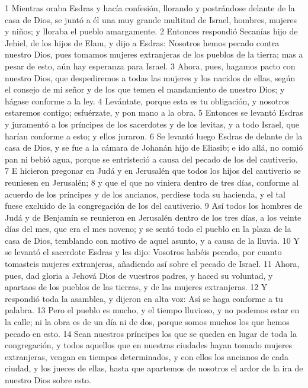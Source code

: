 1 Mientras oraba Esdras y hacía confesión, llorando y postrándose delante de la casa de Dios, se juntó a él una muy grande multitud de Israel, hombres, mujeres y niños; y lloraba el pueblo amargamente.
2 Entonces respondió Secanías hijo de Jehiel, de los hijos de Elam, y dijo a Esdras: Nosotros hemos pecado contra nuestro Dios, pues tomamos mujeres extranjeras de los pueblos de la tierra; mas a pesar de esto, aún hay esperanza para Israel.
3 Ahora, pues, hagamos pacto con nuestro Dios, que despediremos a todas las mujeres y los nacidos de ellas, según el consejo de mi señor y de los que temen el mandamiento de nuestro Dios; y hágase conforme a la ley.
4 Levántate, porque esta es tu obligación, y nosotros estaremos contigo; esfuérzate, y pon mano a la obra.
5 Entonces se levantó Esdras y juramentó a los príncipes de los sacerdotes y de los levitas, y a todo Israel, que harían conforme a esto; y ellos juraron. 
6 Se levantó luego Esdras de delante de la casa de Dios, y se fue a la cámara de Johanán hijo de Eliasib; e ido allá, no comió pan ni bebió agua, porque se entristeció a causa del pecado de los del cautiverio.
7 E hicieron pregonar en Judá y en Jerusalén que todos los hijos del cautiverio se reuniesen en Jerusalén;
8 y que el que no viniera dentro de tres días, conforme al acuerdo de los príncipes y de los ancianos, perdiese toda su hacienda, y el tal fuese excluido de la congregación de los del cautiverio.
9 Así todos los hombres de Judá y de Benjamín se reunieron en Jerusalén dentro de los tres días, a los veinte días del mes, que era el mes noveno; y se sentó todo el pueblo en la plaza de la casa de Dios, temblando con motivo de aquel asunto, y a causa de la lluvia.
10 Y se levantó el sacerdote Esdras y les dijo: Vosotros habéis pecado, por cuanto tomasteis mujeres extranjeras, añadiendo así sobre el pecado de Israel.
11 Ahora, pues, dad gloria a Jehová Dios de vuestros padres, y haced su voluntad, y apartaos de los pueblos de las tierras, y de las mujeres extranjeras.
12 Y respondió toda la asamblea, y dijeron en alta voz: Así se haga conforme a tu palabra.
13 Pero el pueblo es mucho, y el tiempo lluvioso, y no podemos estar en la calle; ni la obra es de un día ni de dos, porque somos muchos los que hemos pecado en esto.
14 Sean nuestros príncipes los que se queden en lugar de toda la congregación, y todos aquellos que en nuestras ciudades hayan tomado mujeres extranjeras, vengan en tiempos determinados, y con ellos los ancianos de cada ciudad, y los jueces de ellas, hasta que apartemos de nosotros el ardor de la ira de nuestro Dios sobre esto.
